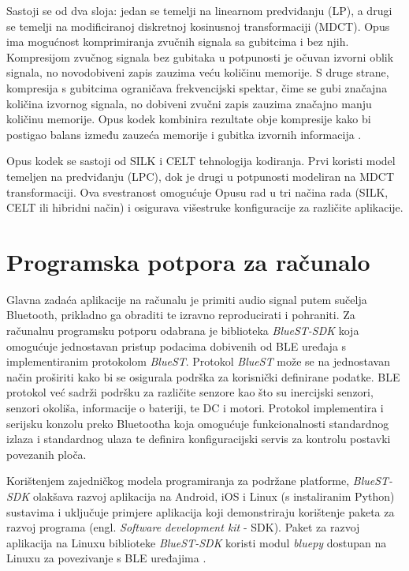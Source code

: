 Sastoji se od dva sloja: jedan se temelji na linearnom predviđanju (LP), a drugi se temelji na modificiranoj diskretnoj kosinusnoj transformaciji (MDCT). Opus ima mogućnost komprimiranja zvučnih signala sa gubitcima i bez njih. Kompresijom zvučnog signala bez gubitaka u potpunosti je očuvan izvorni oblik signala, no novodobiveni zapis zauzima veću količinu memorije. S druge strane, kompresija s gubitcima ograničava frekvencijski spektar, čime se gubi značajna količina izvornog signala, no dobiveni zvučni zapis zauzima značajno manju količinu memorije. Opus kodek kombinira rezultate obje kompresije kako bi postigao balans između zauzeća memorije i gubitka izvornih informacija \cite{opus}. 

Opus kodek se sastoji od SILK i CELT tehnologija kodiranja. Prvi koristi model temeljen na predviđanju (LPC), dok je drugi u potpunosti modeliran na MDCT transformaciji. Ova svestranost omogućuje Opusu rad u tri načina rada (SILK, CELT ili hibridni način) i osigurava višestruke konfiguracije za različite aplikacije.

\section{Programska potpora za računalo}

Glavna zadaća aplikacije na računalu je primiti audio signal putem sučelja Bluetooth, prikladno ga obraditi te izravno reproducirati i pohraniti. Za računalnu programsku potporu odabrana je biblioteka \textit{BlueST-SDK} koja omogućuje jednostavan pristup podacima dobivenih od BLE uređaja s implementiranim protokolom \textit{BlueST}. Protokol \textit{BlueST} može se na jednostavan način proširiti kako bi se osigurala podrška za korisnički definirane podatke. BLE protokol već sadrži podršku za različite senzore kao što su inercijski senzori, senzori okoliša, informacije o bateriji, te DC i motori. Protokol implementira i serijsku konzolu preko Bluetootha koja omogućuje funkcionalnosti standardnog izlaza i standardnog ulaza te definira konfiguracijski servis za kontrolu postavki povezanih ploča. 

Korištenjem zajedničkog modela programiranja za podržane platforme, \textit{BlueST-SDK} olakšava razvoj aplikacija na Android, iOS i Linux (s instaliranim Python) sustavima i uključuje primjere aplikacija koji demonstriraju korištenje paketa za razvoj programa (engl. \textit{Software development kit} - SDK). Paket za razvoj aplikacija na Linuxu biblioteke \textit{BlueST-SDK} koristi modul \textit{bluepy} dostupan na Linuxu za povezivanje s BLE uređajima \cite{bluest}. 

